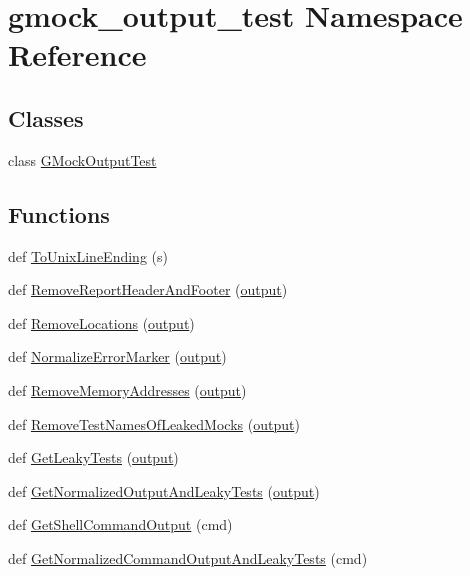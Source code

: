 \hypertarget{namespacegmock__output__test}{}\section{gmock\+\_\+output\+\_\+test Namespace Reference}
\label{namespacegmock__output__test}
\subsection*{Classes}
\begin{DoxyCompactItemize}
\item 
class \hyperlink{classgmock__output__test_1_1_g_mock_output_test}{G\+Mock\+Output\+Test}
\end{DoxyCompactItemize}
\subsection*{Functions}
\begin{DoxyCompactItemize}
\item 
def \hyperlink{namespacegmock__output__test_a5c9ae3611cc4fac1e1340a3345865cf3}{To\+Unix\+Line\+Ending} (s)
\item 
def \hyperlink{namespacegmock__output__test_a2ebfc0abfb0ed307021ecaa9da465c55}{Remove\+Report\+Header\+And\+Footer} (\hyperlink{namespacegmock__output__test_a4277f8598ba3835393fe82e82d09375d}{output})
\item 
def \hyperlink{namespacegmock__output__test_aa3c93f8085ff0886bf0d160d71af2452}{Remove\+Locations} (\hyperlink{namespacegmock__output__test_a4277f8598ba3835393fe82e82d09375d}{output})
\item 
def \hyperlink{namespacegmock__output__test_af3c1f95f19b9f048843a2d562d459b24}{Normalize\+Error\+Marker} (\hyperlink{namespacegmock__output__test_a4277f8598ba3835393fe82e82d09375d}{output})
\item 
def \hyperlink{namespacegmock__output__test_a58b4fdb82b40d01d32b09d4c14ba11a5}{Remove\+Memory\+Addresses} (\hyperlink{namespacegmock__output__test_a4277f8598ba3835393fe82e82d09375d}{output})
\item 
def \hyperlink{namespacegmock__output__test_ac0628c5630d869dae45601df9d909638}{Remove\+Test\+Names\+Of\+Leaked\+Mocks} (\hyperlink{namespacegmock__output__test_a4277f8598ba3835393fe82e82d09375d}{output})
\item 
def \hyperlink{namespacegmock__output__test_a60299c4f0cb666d08f101ddaa7aabed4}{Get\+Leaky\+Tests} (\hyperlink{namespacegmock__output__test_a4277f8598ba3835393fe82e82d09375d}{output})
\item 
def \hyperlink{namespacegmock__output__test_a590ba3b918e5599eeabc2cbf597e2ce1}{Get\+Normalized\+Output\+And\+Leaky\+Tests} (\hyperlink{namespacegmock__output__test_a4277f8598ba3835393fe82e82d09375d}{output})
\item 
def \hyperlink{namespacegmock__output__test_a001498a3e9bf552ee429e434eb00cb08}{Get\+Shell\+Command\+Output} (cmd)
\item 
def \hyperlink{namespacegmock__output__test_a1796bc395fbfb8873992e3f84378e4bf}{Get\+Normalized\+Command\+Output\+And\+Leaky\+Tests} (cmd)
\end{DoxyCompactItemize}
